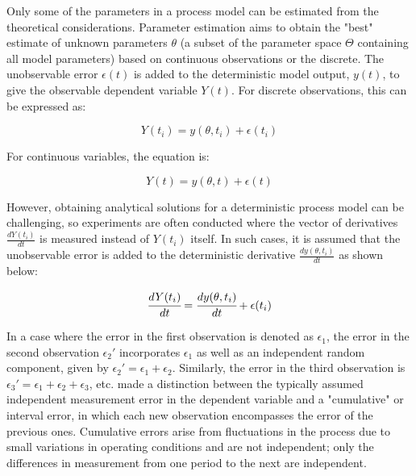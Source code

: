 \documentclass[../Article_Model_Parameters.tex]{subfiles}
\begin{document}
	Only some of the parameters in a process model can be estimated from the theoretical considerations. Parameter estimation aims to obtain the "best" estimate of unknown parameters $\theta$ (a subset of the parameter space $\Theta$ containing all model parameters) based on continuous observations or the discrete. The unobservable error $\epsilon(t)$ is added to the deterministic model output, $y(t)$, to give the observable dependent variable $Y(t)$. For discrete observations, this can be expressed as:
	
	{\footnotesize
		\begin{equation*}
			Y(t_i) = y(\theta, t_i) + \epsilon(t_i)
	\end{equation*} }
	
	For continuous variables, the equation is:
	
	{\footnotesize
		\begin{equation*}
			Y(t) = y(\theta, t) + \epsilon(t)
	\end{equation*} }
	
	However, obtaining analytical solutions for a deterministic process model can be challenging, so experiments are often conducted where the vector of derivatives $\frac{dY(t_i)}{dt}$ is measured instead of $Y(t_i)$ itself. In such cases, it is assumed that the unobservable error is added to the deterministic derivative $\frac{dy(\theta, t_i)}{dt}$ as shown below:
	
	{\footnotesize
		\begin{equation}  \label{EQ: Measurment_noise}
			\cfrac{d Y(t_i)}{dt} = \cfrac{dy(\theta, t_i)}{dt} + \epsilon(t_i)
	\end{equation} }
	
	In a case where the error in the first observation is denoted as $\epsilon_1$, the error in the second observation $\epsilon_2'$ incorporates $\epsilon_1$ as well as an independent random component, given by $\epsilon_2' = \epsilon_1 + \epsilon_2$. Similarly, the error in the third observation is $\epsilon_3' = \epsilon_1 + \epsilon_2 + \epsilon_3$, etc. \citet{Mandel1957}  made a distinction between the typically assumed independent measurement error in the dependent variable and a "cumulative" or interval error, in which each new observation encompasses the error of the previous ones. Cumulative errors arise from fluctuations in the process due to small variations in operating conditions and are not independent; only the differences in measurement from one period to the next are independent.
	
\end{document}
